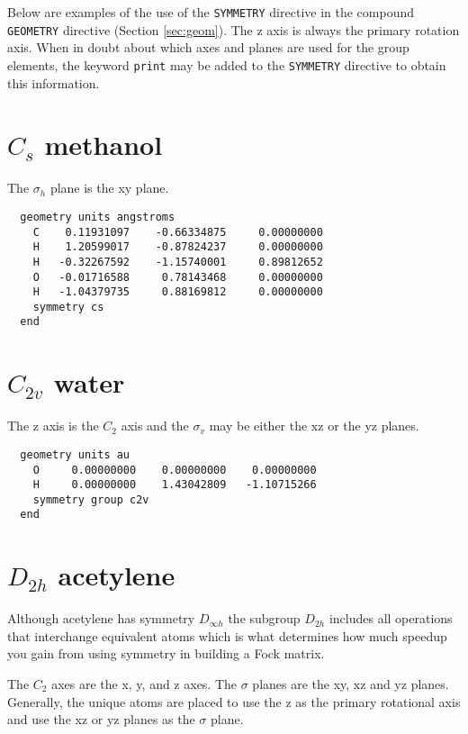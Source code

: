 \label{symexamples}

Below are examples of the use of the \verb+SYMMETRY+ directive in
the compound \verb+GEOMETRY+ directive (Section \ref{sec:geom}).
The z axis is always the primary rotation axis.
When in doubt about which axes and planes are used for the group
elements, the keyword \verb+print+ may be added to the \verb+SYMMETRY+ 
directive to obtain this information.

  \section{\protect$C_{s}$ methanol}

The $\sigma_h$ plane is the xy plane.

\begin{verbatim}
  geometry units angstroms
    C    0.11931097    -0.66334875     0.00000000
    H    1.20599017    -0.87824237     0.00000000
    H   -0.32267592    -1.15740001     0.89812652
    O   -0.01716588     0.78143468     0.00000000
    H   -1.04379735     0.88169812     0.00000000
    symmetry cs
  end
\end{verbatim}

  \section{\protect$C_{2v}$ water}

The z axis is the $C_2$ axis and the $\sigma_v$ may be either the xz or the
yz planes.

\begin{verbatim}
  geometry units au
    O     0.00000000    0.00000000    0.00000000
    H     0.00000000    1.43042809   -1.10715266
    symmetry group c2v
  end
\end{verbatim}

  \section{\protect$D_{2h}$ acetylene}

Although acetylene has symmetry $D_{\infty h}$ the subgroup
$D_{2h}$ includes all operations that interchange equivalent atoms
which is what determines how much speedup you gain from using symmetry
in building a Fock matrix.

The $C_2$ axes are the x, y, and z axes.  The $\sigma$ planes are the xy,
xz and yz planes.  Generally, the unique atoms are placed to use the z
as the primary rotational axis and use the xz or yz planes as the $\sigma$ 
plane.

